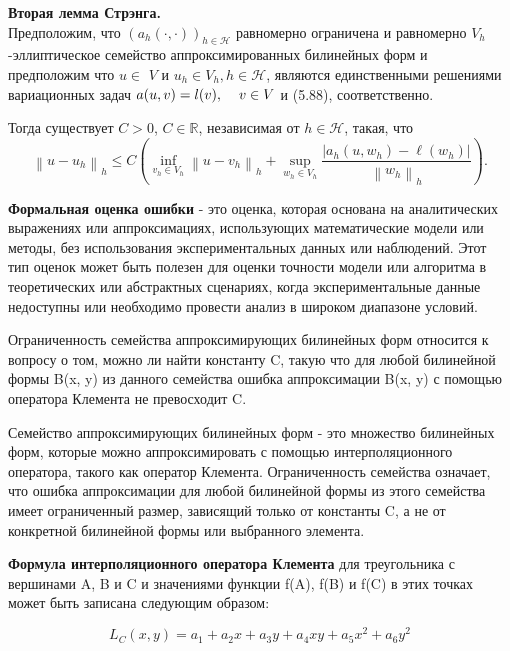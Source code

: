 \documentclass[a4paper, 12pt]{article}%
\begin{document}
	
	
   \textbf {Вторая лемма Стрэнга.}\\
	Предположим, что $\left(a_h(\cdot, \cdot)\right)_{h \in \mathcal{H}}$ равномерно ограничена и равномерно $V_h$-эллиптическое семейство аппроксимированных билинейных форм и предположим что $u \in$ $V$ и $u_h \in V_h, h \in \mathcal{H}$, являются единственными решениями вариационных задач $a(u,v) = l(v), \hspace{4mm} v \in V$ и (5.88), соответственно.
	
	Тогда существует $C > 0$,  $C \in \mathbb{R}$, независимая от $h \in \mathcal{H}$, такая, что
	$$
	\left\|u-u_h\right\|_h \leq C\left(\inf _{v_h \in V_h}\left\|u-v_h\right\|_h+\sup _{w_h \in V_h} \frac{\left|a_h\left(u, w_h\right)-\ell\left(w_h\right)\right|}{\left\|w_h\right\|_h}\right) .
	$$
	
	\vspace{10mm}
	
	\textbf{Формальная оценка ошибки} - это оценка, которая основана на аналитических выражениях или аппроксимациях, использующих математические модели или методы, без использования экспериментальных данных или наблюдений. Этот тип оценок может быть полезен для оценки точности модели или алгоритма в теоретических или абстрактных сценариях, когда экспериментальные данные недоступны или необходимо провести анализ в широком диапазоне условий.
	
	Ограниченность семейства аппроксимирующих билинейных форм относится к вопросу о том, можно ли найти константу C, такую что для любой билинейной формы B(x, y) из данного семейства ошибка аппроксимации B(x, y) с помощью оператора Клемента не превосходит C.
	
	Семейство аппроксимирующих билинейных форм - это множество билинейных форм, которые можно аппроксимировать с помощью интерполяционного оператора, такого как оператор Клемента. Ограниченность семейства означает, что ошибка аппроксимации для любой билинейной формы из этого семейства имеет ограниченный размер, зависящий только от константы C, а не от конкретной билинейной формы или выбранного элемента.
	
	\vspace{10mm}
	
	\textbf{Формула интерполяционного оператора Клемента} для треугольника с вершинами A, B и C и значениями функции f(A), f(B) и f(C) в этих точках может быть записана следующим образом:
	
	$$L_C(x, y) = a_1 + a_2 x + a_3 y + a_4  x y + a_5 x^2 + a_6 y^2$$
	
\end{document}
